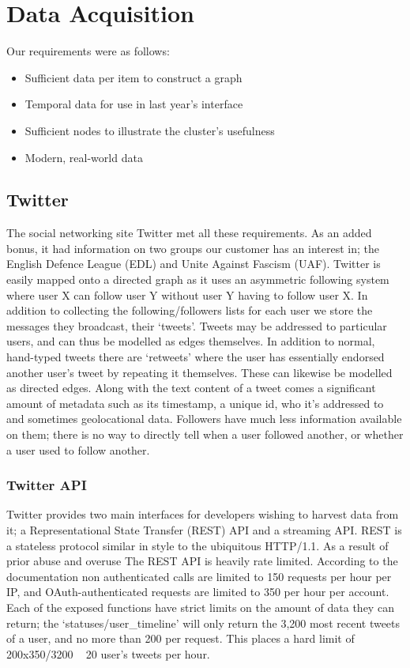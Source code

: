 \section{Data Acquisition}
Our requirements were as follows:
\begin{itemize}
\item Sufficient data per item to construct a graph
\item Temporal data for use in last year's interface
\item Sufficient nodes to illustrate the cluster's usefulness
\item Modern, real-world data
\end{itemize}

\subsection{Twitter}
The social networking site Twitter met all these requirements. As an added bonus, it had information on two groups our customer has an interest in; the English Defence League (EDL) and Unite Against Fascism (UAF). Twitter is easily mapped onto a directed graph as it uses an asymmetric following system where user X can follow user Y without user Y having to follow user X. In addition to collecting the following/followers lists for each user we store the messages they broadcast, their `tweets'. Tweets may be addressed to particular users, and can thus be modelled as edges themselves. In addition to normal, hand-typed tweets there are  `retweets' where the user has essentially endorsed another user's tweet by repeating it themselves. These can likewise be modelled as directed edges. Along with the text content of a tweet comes a significant amount of metadata such as its timestamp, a unique id, who it's addressed to and sometimes geolocational data. Followers have much less information available on them; there is no way to directly tell when a user followed another, or whether a user used to follow another.

\subsubsection{Twitter API}
Twitter provides two main interfaces for developers wishing to harvest data from it; a Representational State Transfer (REST) API and a streaming API. REST is a stateless protocol similar in style to the ubiquitous HTTP/1.1. As a result of prior abuse and overuse The REST API is heavily rate limited. According to the documentation non authenticated calls are limited to 150 requests per hour per IP, and OAuth-authenticated requests are limited to 350 per hour per account. Each of the exposed functions have strict limits on the amount of data they can return; the `statuses/user\_timeline' will only return the 3,200 most recent tweets of a user, and no more than 200 per request. This places a hard limit of 200x350/3200 ~ 20 user's tweets per hour. 

